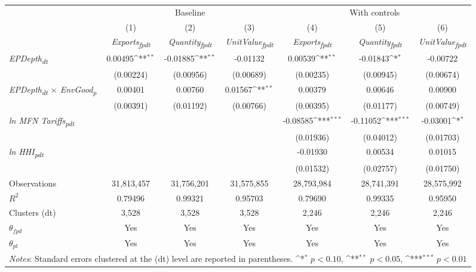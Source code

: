 {
\def\sym#1{\ifmmode^{#1}\else\(^{#1}\)\fi}
\begin{tabular}{l*{6}{c}}
\toprule
&\multicolumn{3}{c}{Baseline}&\multicolumn{3}{c}{With controls}\\\cmidrule(lr){2-4}\cmidrule(lr){5-7}
&(1)&(2)&(3)&(4)&(5)&(6)\\
&\textit{Exports\textsubscript{fpdt}}&\textit{Quantity\textsubscript{fpdt}}&\textit{UnitValue\textsubscript{fpdt}}&\textit{Exports\textsubscript{fpdt}}&\textit{Quantity\textsubscript{fpdt}}&\textit{UnitValue\textsubscript{fpdt}}\\
\midrule
\textit{EPDepth\textsubscript{dt}} & 0.00495\sym{**} & -0.01885\sym{**} & -0.01132 & 0.00539\sym{**} & -0.01843\sym{*} & -0.00722\\
 & (0.00224) & (0.00956) & (0.00689) & (0.00235) & (0.00945) & (0.00674)\\
\addlinespace
\textit{EPDepth\textsubscript{dt} $\times$ EnvGood\textsubscript{p}} & 0.00401 & 0.00760 & 0.01567\sym{**} & 0.00379 & 0.00646 & 0.00900\\
 & (0.00391) & (0.01192) & (0.00766) & (0.00395) & (0.01177) & (0.00749)\\
\addlinespace
\textit{ln MFN Tariffs\textsubscript{pdt}} &  &  &  & -0.08585\sym{***} & -0.11052\sym{***} & -0.03001\sym{*}\\
 &  &  &  & (0.01936) & (0.04012) & (0.01703)\\
\addlinespace
\textit{ln HHI\textsubscript{pdt}} &  &  &  & -0.01930 & 0.00534 & 0.01015\\
 &  &  &  & (0.01532) & (0.02757) & (0.01750)\\
\midrule
Observations & 31,813,457 & 31,756,201 & 31,575,855 & 28,793,984 & 28,741,391 & 28,575,992\\
$R^{2}$ & 0.79496 & 0.99321 & 0.95703 & 0.79690 & 0.99335 & 0.95950\\
Clusters (dt) & 3,528 & 3,528 & 3,528 & 2,246 & 2,246 & 2,246\\
$\theta_{fpd}$ & Yes & Yes & Yes & Yes & Yes & Yes\\
$\theta_{pt}$ & Yes & Yes & Yes & Yes & Yes & Yes\\
\bottomrule
\multicolumn{7}{l}{\footnotesize \textit{Notes}: Standard errors clustered at the (dt) level are reported in parentheses. \sym{*} \(p<0.10\), \sym{**} \(p<0.05\), \sym{***} \(p<0.01\)}\\
\end{tabular}
}
